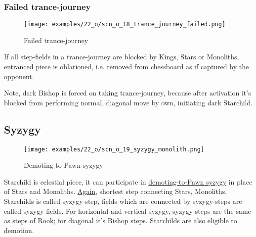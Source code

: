 \subsubsection*{Failed trance-journey}

\vspace*{-1.1\baselineskip}
\noindent
\begin{figure}[!h]
\texttt{[image: examples/22\_o/scn\_o\_18\_trance\_journey\_failed.png]}
\caption{Failed trance-journey}
\label{fig:scn_o_18_trance_journey_failed}
\end{figure}

If all step-fields in a trance-journey are blocked by Kings, Stars or Monoliths, entranced piece is
\hyperref[sec:Terms/Oblation]{oblationed}, i.e. removed from chessboard as if captured by the opponent.

Note, dark Bishop is forced on taking trance-journey, because after activation it's blocked from performing
normal, diagonal move by own, initiating dark Starchild.

\clearpage %

\subsection*{Syzygy}

\vspace*{-1.3\baselineskip}
\noindent
\begin{figure}[!h]
\texttt{[image: examples/22\_o/scn\_o\_19\_syzygy\_monolith.png]}
\caption{Demoting-to-Pawn syzygy}
\label{fig:scn_o_19_syzygy_monolith}
\end{figure}

Starchild is celestial piece, it can participate in
\hyperref[fig:scn_d_15_syzygy_2_stars_init]{demoting-to-Pawn syzygy} in place of Stars and Monoliths.
\hyperref[fig:scn_d_17_syzygy_2_monoliths_init]{Again}, shortest step connecting Stars, Monoliths,
Starchilds is called syzygy-step, fields which are connected by syzygy-steps are called syzygy-fields.
For horizontal and vertical syzygy, syzygy-steps are the same as steps of Rook; for diagonal it’s
Bishop steps. Starchilds are also eligible to demotion.

